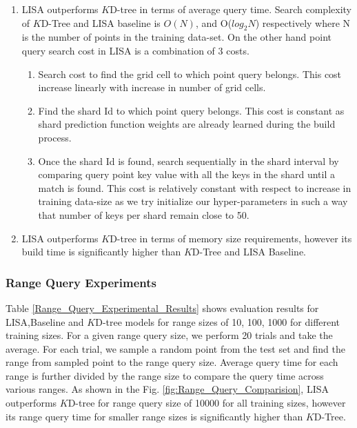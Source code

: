 \begin{enumerate}

    \item LISA outperforms $K$D-tree in terms of average query time. Search complexity of $K$D-Tree and LISA baseline is $O(N)$, and O($log_{2}N$) respectively where N is the number of points in the training data-set. On the other hand point query search cost in LISA is a combination of 3 costs.
    \begin{enumerate}
    \item Search cost to find the grid cell to which point query belongs. This cost increase linearly with increase in number of grid cells. 
    
    \item Find the shard Id to which point query belongs. This cost is constant as shard prediction function weights are already learned during the build process. 
    
    \item Once the shard Id is found, search sequentially in the shard interval by comparing query point key value with all the keys in the shard until a match is found. This cost is relatively constant with respect to increase in training data-size as we try initialize our hyper-parameters in such a way that number of keys per shard remain close to 50. 
\end{enumerate}
    
    \item LISA outperforms $K$D-tree in terms of memory size requirements, however its build time is significantly higher than $K$D-Tree and LISA Baseline. 
\end{enumerate}

\subsubsection {Range Query Experiments}
Table \ref{Range_Query_Experimental_Results} shows evaluation results for LISA,Baseline and $K$D-tree models for range sizes of 10, 100, 1000 for different training sizes. For a given range query size, we perform 20 trials and take the average. For each trial, we sample a random point from the test set and find the range from sampled point to the range query size. Average query time for each range is further divided by the range size to compare the query time across various ranges. As shown in the Fig. \ref{fig:Range_Query_Comparision}, LISA outperforms $K$D-tree for range query size of 10000 for all training sizes, however its range query time for smaller range sizes is significantly higher than $K$D-Tree.

